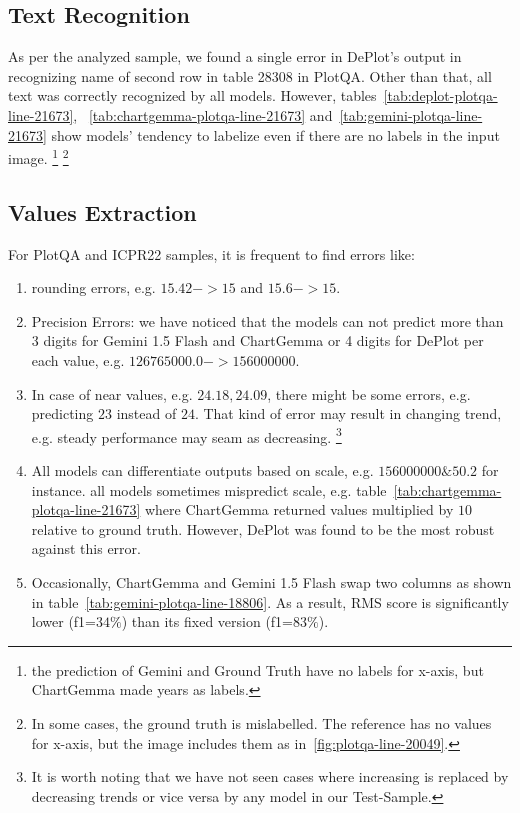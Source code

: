 \documentclass[
	letterpaper, %
]{jdf}
\begin{document}
\subsection{Text Recognition}\label{ssect:qualitative-text-recognition}
As per the analyzed sample, we found a single error in DePlot's output in  recognizing name of second row in table 28308 in PlotQA.
Other than that, all text was correctly recognized by all models.
However, tables~\ref{tab:deplot-plotqa-line-21673}, ~\ref{tab:chartgemma-plotqa-line-21673} and~\ref{tab:gemini-plotqa-line-21673} show models' tendency to labelize even if there are no labels in the input image.
\footnote{the prediction of Gemini and Ground Truth have no labels for x-axis, but ChartGemma made years as labels.}
\footnote{In some cases, the ground truth is mislabelled. The reference has no values for x-axis, but the image includes them as in~\ref{fig:plotqa-line-20049}.}

\subsection{Values Extraction}\label{ssect:values-extraction}
For PlotQA and ICPR22 samples, it is frequent to find errors like:
\begin{enumerate}
     \item rounding errors, e.g. $15.42->15$ and $15.6->15$.
     \item Precision Errors: we have noticed that the models can not predict more than 3 digits for Gemini 1.5 Flash and ChartGemma or 4 digits for DePlot per each value, e.g. $126765000.0->156000000$.
     \item In case of near values, e.g. $24.18, 24.09$, there might be some errors, e.g. predicting $23$ instead of $24$.
       That kind of error may result in changing trend, e.g. steady performance may seam as decreasing.
       \footnote{It is worth noting that we have not seen cases where increasing is replaced by decreasing trends or vice versa by any model in our Test-Sample.}
       \item All models can differentiate outputs based on scale, e.g. $156000000 \& 50.2$ for instance.
all models sometimes mispredict scale, e.g. table~\ref{tab:chartgemma-plotqa-line-21673} where ChartGemma returned values multiplied by $10$ relative to ground truth.
However, DePlot was found to be the most robust against this error.
       \item Occasionally, ChartGemma and Gemini 1.5 Flash swap two columns as shown in table~\ref{tab:gemini-plotqa-line-18806}.
         As a result, RMS score is significantly lower (f1=$34\%$) than its fixed version (f1=$83\%$).
       \end{enumerate}
\end{document}
